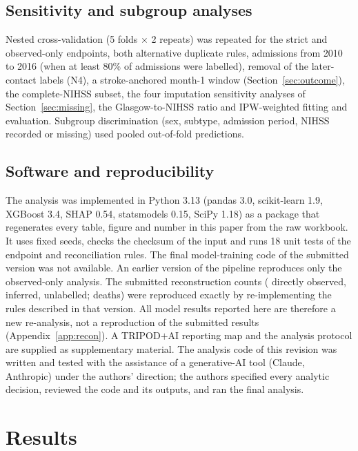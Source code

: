 \documentclass[preprint,10pt]{elsarticle}
\begin{document}
\subsection{Sensitivity and subgroup analyses}
\label{sec:sens-methods}
Nested cross-validation (5 folds $\times$ 2 repeats) was repeated for the strict and observed-only endpoints, both alternative duplicate rules, admissions from 2010 to 2016 (when at least 80\% of admissions were labelled), removal of the later-contact labels (N4), a stroke-anchored month-1 window (Section~\ref{sec:outcome}), the complete-NIHSS subset, the four imputation sensitivity analyses of Section~\ref{sec:missing}, the Glasgow-to-NIHSS ratio and IPW-weighted fitting and evaluation. Subgroup discrimination (sex, subtype, admission period, NIHSS recorded or missing) used pooled out-of-fold predictions.

\subsection{Software and reproducibility}
\label{sec:repro}
The analysis was implemented in Python 3.13 (pandas 3.0, scikit-learn 1.9, XGBoost 3.4, SHAP 0.54, statsmodels 0.15, SciPy 1.18) as a package that regenerates every table, figure and number in this paper from the raw workbook. It uses fixed seeds, checks the checksum of the input and runs 18 unit tests of the endpoint and reconciliation rules. The final model-training code of the submitted version was not available. An earlier version of the pipeline reproduces only the observed-only analysis. The submitted reconstruction counts (\OrigObs{} directly observed, \OrigInf{} inferred, \OrigUnl{} unlabelled; \OrigDeaths{} deaths) were reproduced exactly by re-implementing the rules described in that version. All model results reported here are therefore a new re-analysis, not a reproduction of the submitted results (Appendix~\ref{app:recon}). A TRIPOD$+$AI reporting map and the analysis protocol are supplied as supplementary material. The analysis code of this revision was written and tested with the assistance of a generative-AI tool (Claude, Anthropic) under the authors' direction; the authors specified every analytic decision, reviewed the code and its outputs, and ran the final analysis.

\section{Results}
\end{document}

